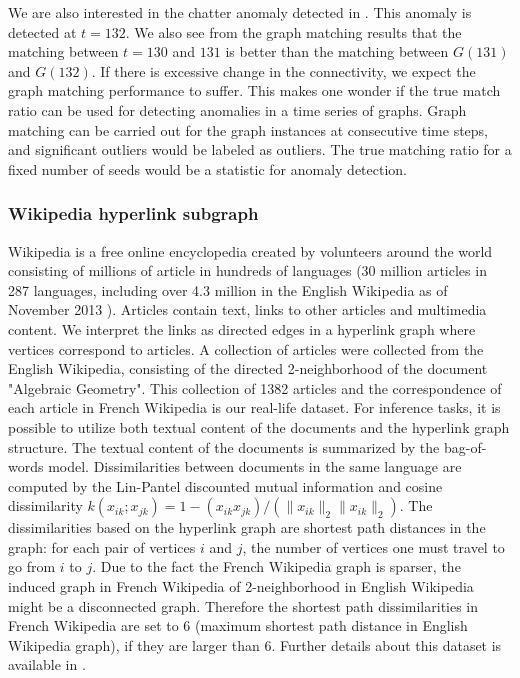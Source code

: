 \documentclass[12pt,oneside,final]{thesis}\usepackage[]{graphicx}\usepackage[]{color}
\begin{document}
We are also interested in the chatter anomaly detected in \cite{EnronStudy}. This anomaly is detected at $t=132$. We also see from the graph matching results that the matching between $t=130$ and $131$ is better than the matching between $G(131)$ and $G(132)$. If there is excessive change in the connectivity, we expect the graph matching performance to suffer. This makes one wonder if the true match ratio can be used for detecting anomalies in a time series of graphs. Graph matching can be carried out for the graph instances at consecutive time steps, and significant outliers would be labeled as outliers. The true matching ratio  for a fixed number of seeds would be a statistic for anomaly detection. 

\subsubsection{Wikipedia hyperlink subgraph}

Wikipedia is a free online encyclopedia created by volunteers around the world consisting of millions of article in hundreds of languages (30 million articles in 287 languages, including over 4.3 million in the English Wikipedia as of November 2013 \cite{wikipedia}). Articles contain text, links to other articles and multimedia content. We interpret the links as directed edges in a hyperlink graph where vertices correspond to articles. A collection of articles were collected from the English Wikipedia, consisting of the
 directed 2-neighborhood of the document "Algebraic Geometry"\cite{wikiwebpage}. 
   This  collection of 1382 articles and the correspondence of each article in French 
Wikipedia is our real-life dataset. For inference tasks, it is possible to utilize both textual content of the documents and the hyperlink graph structure. The textual content of the documents is summarized by the bag-of-words model. Dissimilarities between documents  in the same language are computed by the Lin-Pantel discounted mutual information \cite{LinPantel,PantelLin}
 and cosine dissimilarity $k(x_{ik}; x_{jk}) = 1 - (x_{ik} x_{jk})/(\|x_{ik}\|_2\|x_{ik}\|_2)$. 
 The dissimilarities based on the hyperlink graph are shortest path distances in the graph:
 for each pair of vertices $i$ and $j$, the number of vertices one must travel to go from $i$ to $j$. Due to the fact the French Wikipedia graph is sparser, the induced graph in French Wikipedia of 2-neighborhood in English Wikipedia might be a disconnected graph. Therefore the shortest path dissimilarities in French Wikipedia are set to 6 (maximum shortest path distance in English Wikipedia graph), if they are larger than 6.  Further details about this dataset is available in \cite{Zhiliang_disparate}.
 
\end{document}
